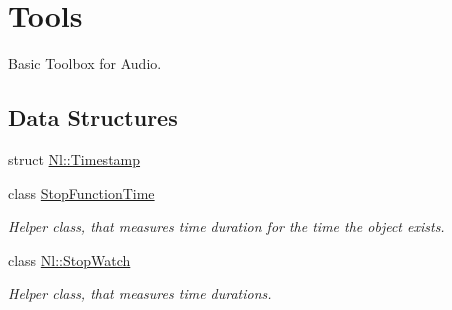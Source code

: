 \hypertarget{group__Tools}{\section{Tools}
\label{group__Tools}
}


Basic Toolbox for Audio.  


\subsection*{Data Structures}
\begin{DoxyCompactItemize}
\item 
struct \hyperlink{structNl_1_1Timestamp}{Nl\-::\-Timestamp}
\item 
class \hyperlink{classStopFunctionTime}{Stop\-Function\-Time}
\begin{DoxyCompactList}\small\item\em Helper class, that measures time duration for the time the object exists. \end{DoxyCompactList}\item 
class \hyperlink{classNl_1_1StopWatch}{Nl\-::\-Stop\-Watch}
\begin{DoxyCompactList}\small\item\em Helper class, that measures time durations. \end{DoxyCompactList}\end{DoxyCompactItemize}
